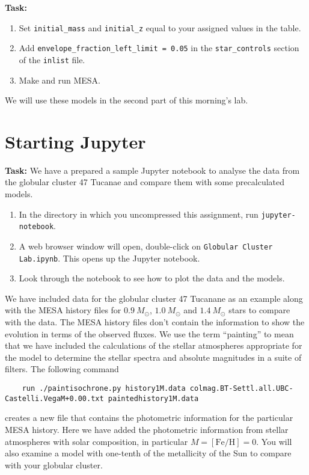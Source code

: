 \documentclass{article}
\begin{document}
{\bf Task:}
\begin{enumerate}
 \setlength\itemsep{0em}
    \item 
Set \texttt{initial\_mass} and \texttt{initial\_z} equal to your assigned values in the table.  
\item Add  \texttt{envelope\_fraction\_left\_limit = 0.05} in the \texttt{star\_controls} section of the \texttt{inlist} file. 
\item Make and run MESA.
\end{enumerate}
We will use these models in the second part of this morning's lab.

\section{Starting Jupyter}

\textbf{Task:} We have a prepared a sample Jupyter notebook to analyse the data from the globular cluster 47 Tucanae and compare them with some precalculated models.   
\begin{enumerate}
 \setlength\itemsep{0em}
\item
In the directory in which you uncompressed this assignment, run \texttt{jupyter-notebook}.
\item
A web browser window will open, double-click on \texttt{Globular Cluster Lab.ipynb}.  This opens up the Jupyter notebook.
\item
Look through the notebook to see how to plot the data and the models. 
\end{enumerate}
We have included data for the globular cluster 47 Tucanane as an example along with the MESA history files for  $0.9~M_\odot$, $1.0~M_\odot$ and $1.4~M_\odot$ stars to compare with the data.   The MESA history files don't contain the information to show the evolution in terms of the observed fluxes.  We use the term ``painting'' to mean that we have included the calculations of the stellar atmospheres appropriate for the model to determine the stellar spectra and absolute magnitudes in a suite of filters.  The following command
{\small{
\begin{verbatim}
    run ./paintisochrone.py history1M.data colmag.BT-Settl.all.UBC-Castelli.VegaM+0.00.txt paintedhistory1M.data
\end{verbatim}
}}
creates a new file that contains the photometric information for the particular MESA history.  Here we have added the photometric information from stellar atmospheres with solar composition, in particular $M=[\textrm{Fe/H}]=0$.  You will also examine a model with one-tenth of the metallicity of the Sun to compare with your globular cluster.
\end{document}
